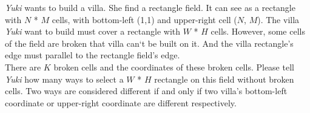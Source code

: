 \textit{Yuki} wants to build a villa. She find a rectangle field. It can see as a rectangle with $N$ * $M$ cells, with bottom-left (1,1) and upper-right cell ($N$, $M$). The villa \textit{Yuki} want to build  must cover a rectangle with $W$ * $H$ cells. However, some cells of the field are broken that villa can`t be built on it. And the villa rectangle's edge must parallel to the rectangle field's edge.\\
There are $K$ broken cells and the coordinates of these broken cells. Please tell \textit{Yuki} how many ways to select a $W$ * $H$ rectangle on this field without broken cells. Two ways are considered different if and only if two villa's bottom-left coordinate or upper-right coordinate are different respectively. 